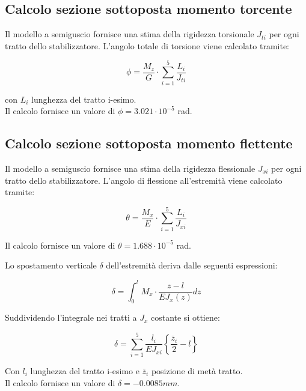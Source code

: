 \documentclass[
10pt, %
a4paper, %
oneside, %
headinclude,footinclude, %
BCOR5mm, %
]{scrartcl}
\begin{document}
\subsection{Calcolo sezione sottoposta momento torcente}

Il modello a semiguscio fornisce una stima della rigidezza torsionale $J_{ti}$ per ogni tratto dello stabilizzatore. L'angolo totale di torsione viene calcolato tramite:

\begin{equation}
	\phi = \frac{M_z}{G} \cdot \sum_{i=1}^{5} \frac{L_i}{J_{ti}}
	\label{eq:sg_torque}
\end{equation}

con $L_i$ lunghezza del tratto i-esimo.\\
Il calcolo fornisce un valore di $\phi = 3.021 \cdot 10^{-5}$ rad.



\subsection{Calcolo sezione sottoposta momento flettente}

Il modello a semiguscio fornisce una stima della rigidezza flessionale $J_{xi}$ per ogni tratto dello stabilizzatore. L'angolo di flessione all'estremità viene calcolato tramite:


\begin{equation}
\theta = \frac{M_x}{E} \cdot \sum_{i=1}^{5} \frac{L_i}{J_{xi}}
\label{eq:sg_tip_flex}
\end{equation}

Il calcolo fornisce un valore di $\theta = 1.688 \cdot 10^{-5}$ rad.

Lo spostamento verticale $\delta$ dell'estremità deriva dalle seguenti espressioni:

\begin{equation}
\delta = \int_{0}^{l}M_x \cdot \frac{z-l}{EJ_x(z)}dz
\label{eq:sg_tip1}
\end{equation}

Suddividendo l'integrale nei tratti a $J_x$ costante si ottiene:

\begin{equation}
\delta = \sum_{i=1}^{5} \frac{l_i}{EJ_{xi}} \left\{ \frac{\bar{z}_i}{2}  - l  \right\} 
\label{eq:sg_tip2}
\end{equation}

Con $l_i$ lunghezza del tratto i-esimo e $\bar{z}_i$ posizione di metà tratto.\\
Il calcolo fornisce un valore di $\delta = -0.0085mm$.
\end{document}
